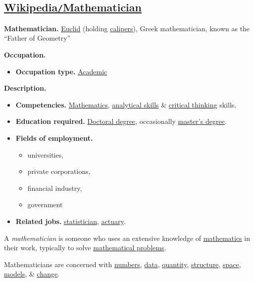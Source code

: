 \documentclass{article}
\begin{document}
\subsection{\href{https://en.wikipedia.org/wiki/Mathematician}{Wikipedia\texttt{/}Mathematician}}
\textbf{Mathematician.} \href{https://en.wikipedia.org/wiki/Euclid}{Euclid} (holding \href{https://en.wikipedia.org/wiki/Calipers}{calipers}), Greek mathematician, known as the ``Father of Geometry''

\noindent
\textbf{Occupation.}
\begin{itemize}
	\item \textbf{Occupation type.} \href{https://en.wikipedia.org/wiki/Academic}{Academic}
\end{itemize}
\textbf{Description.}
\begin{itemize}
	\item \textbf{Competencies.} \href{https://en.wikipedia.org/wiki/Mathematics}{Mathematics}, \href{https://en.wikipedia.org/wiki/Analytical_skill}{analytical skills} \& \href{https://en.wikipedia.org/wiki/Critical_thinking}{critical thinking} skills.
	\item \textbf{Education required.} \href{https://en.wikipedia.org/wiki/Doctoral_degree}{Doctoral degree}, occasionally \href{https://en.wikipedia.org/wiki/Master's_degree}{master's degree}.
	\item \textbf{Fields of employment.}
	\begin{itemize}
		\item universities,
		\item private corporations,
		\item financial industry,
		\item government
	\end{itemize}
	\item \textbf{Related jobs.} \href{https://en.wikipedia.org/wiki/Statistician}{statistician}, \href{https://en.wikipedia.org/wiki/Actuary}{actuary}.
\end{itemize}
A \textit{mathematician} is someone who uses an extensive knowledge of \href{https://en.wikipedia.org/wiki/Mathematics}{mathematics} in their work, typically to solve \href{https://en.wikipedia.org/wiki/Mathematical_problem}{mathematical problems}.

Mathematicians are concerned with \href{https://en.wikipedia.org/wiki/Number}{numbers}, \href{https://en.wikipedia.org/wiki/Data}{data}, \href{https://en.wikipedia.org/wiki/Quantity}{quantity}, \href{https://en.wikipedia.org/wiki/Mathematical_structure}{structure}, \href{https://en.wikipedia.org/wiki/Space}{space}, \href{https://en.wikipedia.org/wiki/Mathematical_model}{models}, \& \href{https://en.wikipedia.org/wiki/Mathematics#Change}{change}.
\end{document}
